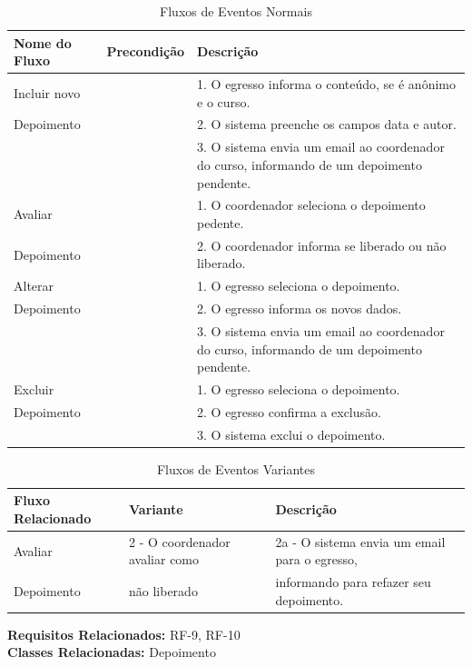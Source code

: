 \begin{table}[h]
	\centering 	\vspace{0.5cm} 	\footnotesize
	\caption{Fluxos de Eventos Normais}
	\begin{tabular}{|p{2.3cm}|p{1.8cm}|p{10.7cm}|} \hline  \rowcolor[rgb]{0.8,0.8,0.8}
 					
 		Nome do Fluxo & Precondição & Descrição  \\ \hline		
	
		Incluir novo & {} & 1. O egresso informa o conteúdo, se é anônimo e o curso. \\ 
		Depoimento & {} & 2. O sistema preenche os campos data e autor. \\
		{} & {} & 3. O sistema envia um email ao coordenador do curso, informando de um depoimento pendente. \\ \hline
		
		Avaliar  & {} & 1. O coordenador seleciona o depoimento pedente. \\ 
		Depoimento & {} & 2. O coordenador informa se liberado ou não liberado. \\\hline
				
		Alterar  & {} & 1. O egresso seleciona o depoimento. \\ 
		Depoimento & {} & 2. O egresso informa os novos dados. \\
		{} & {} & 3. O sistema envia um email ao coordenador do curso, informando de um depoimento pendente. \\ \hline
		
		Excluir   & {} & 1. O egresso seleciona o depoimento. \\ 
		Depoimento & {} & 2. O egresso confirma a exclusão. \\
		{} & {} & 3. O sistema exclui o depoimento. \\ \hline
				
	\end{tabular}	
\end{table}

\begin{table}[h]
	\centering 	\vspace{0.5cm}    \footnotesize
	\caption{Fluxos de Eventos Variantes}
	\begin{tabular}{|p{2.3cm}|p{4.8cm}|p{7.7cm}|}    \hline  \rowcolor[rgb]{0.8,0.8,0.8}
 		
 		Fluxo Relacionado &  Variante  &  Descrição    \\	\hline		
		
		Avaliar    & 2 - O coordenador avaliar como   & 2a - O sistema envia um email para o egresso,  \\ 
		Depoimento & não liberado & informando para refazer seu depoimento. \\\hline
		
	\end{tabular}
\end{table}

\noindent  \textbf{Requisitos Relacionados:} RF-9, RF-10     \\ \textbf{Classes Relacionadas:} Depoimento






